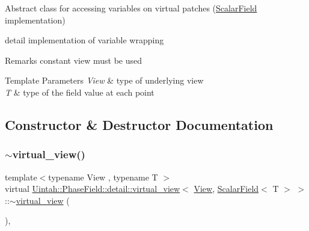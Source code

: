 Abstract class for accessing variables on virtual patches (\hyperlink{structUintah_1_1PhaseField_1_1ScalarField}{Scalar\+Field} implementation) 

detail implementation of variable wrapping

\begin{DoxyRemark}{Remarks}
constant view must be used
\end{DoxyRemark}

\begin{DoxyTemplParams}{Template Parameters}
{\em View} & type of underlying view \\
\hline
{\em T} & type of the field value at each point \\
\hline
\end{DoxyTemplParams}


\subsection{Constructor \& Destructor Documentation}
\mbox{\label{classUintah_1_1PhaseField_1_1detail_1_1virtual__view_3_01View_00_01ScalarField_3_01T_01_4_01_4_af5b408c272dd86037d299bb56cacb611}} 
\subsubsection{\texorpdfstring{$\sim$virtual\+\_\+view()}{~virtual\_view()}}
{\footnotesize\ttfamily template$<$typename View , typename T $>$ \\
virtual \hyperlink{classUintah_1_1PhaseField_1_1detail_1_1virtual__view}{Uintah\+::\+Phase\+Field\+::detail\+::virtual\+\_\+view}$<$ \hyperlink{namespaceUintah_1_1PhaseField_a59210a1e28eba254d428762c92ddeabb}{View}, \hyperlink{structUintah_1_1PhaseField_1_1ScalarField}{Scalar\+Field}$<$ T $>$ $>$\+::$\sim$\hyperlink{classUintah_1_1PhaseField_1_1detail_1_1virtual__view}{virtual\+\_\+view} (\begin{DoxyParamCaption}{ }\end{DoxyParamCaption})\hspace{0.3cm}{\ttfamily [virtual]}, {\ttfamily [default]}}

